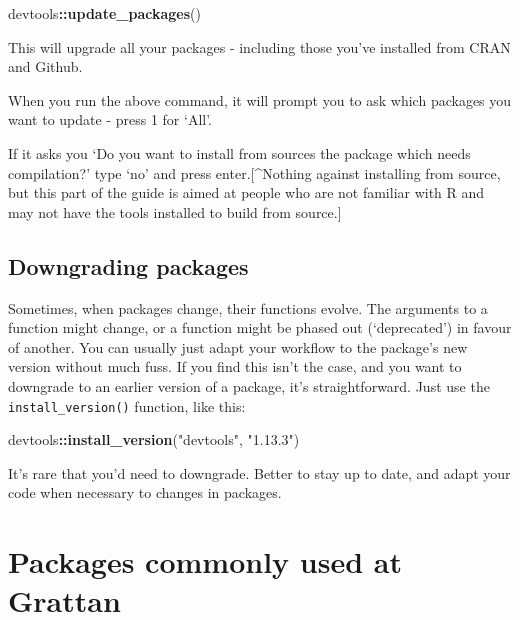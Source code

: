 \documentclass[
]{book}
\newenvironment{Shaded}{\begin{snugshade}}{\end{snugshade}}
\newcommand{\KeywordTok}[1]{\textcolor[rgb]{0.13,0.29,0.53}{\textbf{#1}}}
\newcommand{\NormalTok}[1]{#1}
\newcommand{\OperatorTok}[1]{\textcolor[rgb]{0.81,0.36,0.00}{\textbf{#1}}}
\newcommand{\StringTok}[1]{\textcolor[rgb]{0.31,0.60,0.02}{#1}}
\begin{document}
\begin{Shaded}
\begin{Highlighting}[]
\NormalTok{devtools}\OperatorTok{::}\KeywordTok{update\_packages}\NormalTok{()}
\end{Highlighting}
\end{Shaded}

This will upgrade all your packages - including those you've installed from CRAN and Github.

When you run the above command, it will prompt you to ask which packages you want to update - press 1 for `All'.

If it asks you `Do you want to install from sources the package which needs compilation?' type `no' and press enter.{[}\^{}Nothing against installing from source, but this part of the guide is aimed at people who are not familiar with R and may not have the tools installed to build from source.{]}

\hypertarget{downgrading-packages}{%
\section{Downgrading packages}\label{downgrading-packages}}

Sometimes, when packages change, their functions evolve. The arguments to a function might change, or a function might be phased out (`deprecated') in favour of another. You can usually just adapt your workflow to the package's new version without much fuss. If you find this isn't the case, and you want to downgrade to an earlier version of a package, it's straightforward. Just use the \texttt{install\_version()} function, like this:

\begin{Shaded}
\begin{Highlighting}[]
\NormalTok{devtools}\OperatorTok{::}\KeywordTok{install\_version}\NormalTok{(}\StringTok{"devtools"}\NormalTok{, }\StringTok{"1.13.3"}\NormalTok{)}
\end{Highlighting}
\end{Shaded}

It's rare that you'd need to downgrade. Better to stay up to date, and adapt your code when necessary to changes in packages.

\hypertarget{packages-commonly-used-at-grattan}{%
\chapter{Packages commonly used at Grattan}\label{packages-commonly-used-at-grattan}}
\end{document}
